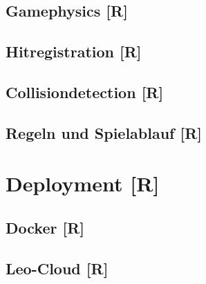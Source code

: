 \subsection{Gamephysics [R]}
\subsection{Hitregistration [R]}
\subsection{Collisiondetection [R]}
\subsection{Regeln und Spielablauf [R]}
\section{Deployment [R]}
\subsection{Docker [R]}
\subsection{Leo-Cloud [R]}








